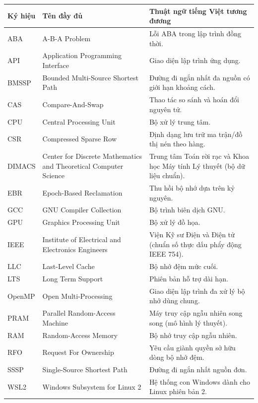 \documentclass[12pt,a4paper,openany,oneside]{report}
\theoremstyle{plain}
\numberwithin{equation}{section}
\begin{document}
\begin{longtable}{|>{\centering\arraybackslash}p{2.5cm}|>{\raggedright\arraybackslash}p{5.5cm}|>{\raggedright\arraybackslash}p{7cm}|}
    \hline
    \textbf{Ký hiệu} & \textbf{Tên đầy đủ} & \textbf{Thuật ngữ tiếng Việt tương đương} \\
    \hline
    \endhead

    ABA & A-B-A Problem & Lỗi ABA trong lập trình đồng thời. \\
    \hline
    API & Application Programming Interface & Giao diện lập trình ứng dụng. \\
    \hline
    BMSSP & Bounded Multi-Source Shortest Path & Đường đi ngắn nhất đa nguồn có giới hạn khoảng cách. \\
    \hline
    CAS & Compare-And-Swap & Thao tác so sánh và hoán đổi nguyên tử. \\
    \hline
    CPU & Central Processing Unit & Bộ xử lý trung tâm. \\
    \hline
    CSR & Compressed Sparse Row & Định dạng lưu trữ ma trận/đồ thị nén theo hàng. \\
    \hline
    DIMACS & Center for Discrete Mathematics and Theoretical Computer Science & Trung tâm Toán rời rạc và Khoa học Máy tính Lý thuyết (bộ dữ liệu chuẩn). \\
    \hline
    EBR & Epoch-Based Reclamation & Thu hồi bộ nhớ dựa trên kỷ nguyên. \\
    \hline
    GCC & GNU Compiler Collection & Bộ trình biên dịch GNU. \\
    \hline
    GPU & Graphics Processing Unit & Bộ xử lý đồ họa. \\
    \hline
    IEEE & Institute of Electrical and Electronics Engineers & Viện Kỹ sư Điện và Điện tử (chuẩn số thực dấu phẩy động IEEE 754). \\
    \hline
    LLC & Last-Level Cache & Bộ nhớ đệm mức cuối. \\
    \hline
    LTS & Long Term Support & Phiên bản hỗ trợ dài hạn. \\
    \hline
    OpenMP & Open Multi-Processing & Giao diện lập trình đa xử lý bộ nhớ dùng chung. \\
    \hline
    PRAM & Parallel Random-Access Machine & Máy truy cập ngẫu nhiên song song (mô hình lý thuyết). \\
    \hline
    RAM & Random-Access Memory & Bộ nhớ truy cập ngẫu nhiên. \\
    \hline
    RFO & Request For Ownership & Yêu cầu giành quyền sở hữu dòng bộ nhớ đệm. \\
    \hline
    SSSP & Single-Source Shortest Path & Đường đi ngắn nhất nguồn đơn. \\
    \hline
    WSL2 & Windows Subsystem for Linux 2 & Hệ thống con Windows dành cho Linux phiên bản 2. \\
    \hline
\end{longtable}
\end{document}
